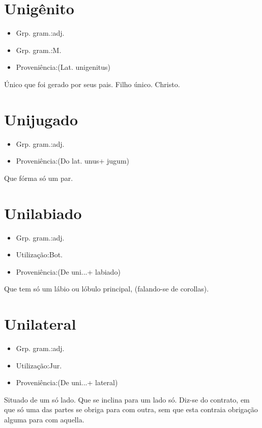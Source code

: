 \documentclass{article}
\begin{document}
\section{Unigênito}
\begin{itemize}
\item {Grp. gram.:adj.}
\end{itemize}
\begin{itemize}
\item {Grp. gram.:M.}
\end{itemize}
\begin{itemize}
\item {Proveniência:(Lat. \textunderscore unigenitus\textunderscore )}
\end{itemize}
Único que foi gerado por seus pais.
Filho único.
Christo.
\section{Unijugado}
\begin{itemize}
\item {Grp. gram.:adj.}
\end{itemize}
\begin{itemize}
\item {Proveniência:(Do lat. \textunderscore unus\textunderscore  + \textunderscore jugum\textunderscore )}
\end{itemize}
Que fórma só um par.
\section{Unilabiado}
\begin{itemize}
\item {Grp. gram.:adj.}
\end{itemize}
\begin{itemize}
\item {Utilização:Bot.}
\end{itemize}
\begin{itemize}
\item {Proveniência:(De \textunderscore uni...\textunderscore  + \textunderscore labiado\textunderscore )}
\end{itemize}
Que tem só um lábio ou lóbulo principal, (falando-se de corollas).
\section{Unilateral}
\begin{itemize}
\item {Grp. gram.:adj.}
\end{itemize}
\begin{itemize}
\item {Utilização:Jur.}
\end{itemize}
\begin{itemize}
\item {Proveniência:(De \textunderscore uni...\textunderscore  + \textunderscore lateral\textunderscore )}
\end{itemize}
Situado de um só lado.
Que se inclina para um lado só.
Diz-se do contrato, em que só uma das partes se obriga para com outra, sem que esta contraia obrigação alguma para com aquella.
\end{document}
